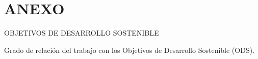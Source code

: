 \documentclass[11pt,a4paper]{article}
\begin{document}
\phantom{x}
\vspace{1ex}

\section*{ANEXO}
\vspace{2ex}

OBJETIVOS DE DESARROLLO SOSTENIBLE

\vspace{4ex}

Grado de relación del trabajo con los Objetivos de Desarrollo Sostenible (ODS).

\vspace{2ex}


\begingroup
\footnotesize


\endgroup
\end{document}
